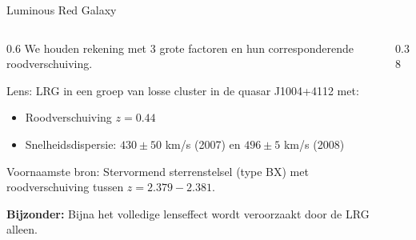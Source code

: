 \documentclass[aspectratio=169,xcolor=dvipsnames]{beamer}
\begin{document}
\begin{frame}{Luminous Red Galaxy}
    \begin{columns}[T] %
        
        \begin{column}{0.6\textwidth}
            We houden rekening met 3 grote factoren en hun corresponderende roodverschuiving.
            
            \vspace{0.2cm}
            Lens: LRG in een groep van losse cluster in de quasar J1004+4112 met:
            
            \vspace{0.2cm}
            \begin{itemize}
                \item Roodverschuiving $z = 0.44$
                \item Snelheidsdispersie: $430 \pm 50$ km/s (2007) en $496 \pm 5$ km/s (2008)
            \end{itemize}

            \vspace{0.2cm}
            Voornaamste bron: Stervormend sterrenstelsel (type BX) met roodverschuiving tussen $z = 2.379-2.381$.

            \vspace{0.2cm}
            \textbf{Bijzonder:} Bijna het volledige lenseffect wordt veroorzaakt door de LRG alleen.

            \vspace{0.2cm}
        
            
        \end{column}

        \begin{column}{0.38\textwidth}
        \end{column}
        
    \end{columns}
\end{frame}
\end{document}
